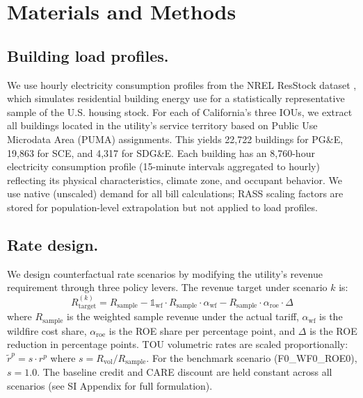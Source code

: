 \documentclass[9pt,twocolumn,twoside]{pnas-new}
\begin{document}
\section*{Materials and Methods}

\subsection*{Building load profiles.}
We use hourly electricity consumption profiles from the NREL ResStock dataset \cite{resstock2024}, which simulates residential building energy use for a statistically representative sample of the U.S. housing stock. For each of California's three IOUs, we extract all buildings located in the utility's service territory based on Public Use Microdata Area (PUMA) assignments. This yields 22,722 buildings for PG\&E, 19,863 for SCE, and 4,317 for SDG\&E. Each building has an 8,760-hour electricity consumption profile (15-minute intervals aggregated to hourly) reflecting its physical characteristics, climate zone, and occupant behavior. We use native (unscaled) demand for all bill calculations; RASS scaling factors are stored for population-level extrapolation but not applied to load profiles.

\subsection*{Rate design.}
We design counterfactual rate scenarios by modifying the utility's revenue requirement through three policy levers. The revenue target under scenario $k$ is:
\begin{equation}
    R_{\text{target}}^{(k)} = R_{\text{sample}} - \mathbb{1}_{\text{wf}} \cdot R_{\text{sample}} \cdot \alpha_{\text{wf}} - R_{\text{sample}} \cdot \alpha_{\text{roe}} \cdot \Delta
\end{equation}
where $R_{\text{sample}}$ is the weighted sample revenue under the actual tariff, $\alpha_{\text{wf}}$ is the wildfire cost share, $\alpha_{\text{roe}}$ is the ROE share per percentage point, and $\Delta$ is the ROE reduction in percentage points. TOU volumetric rates are scaled proportionally: $\tilde{r}^p = s \cdot r^p$ where $s = R_{\text{vol}} / R_{\text{sample}}$. For the benchmark scenario (F0\_WF0\_ROE0), $s = 1.0$. The baseline credit and CARE discount are held constant across all scenarios (see SI Appendix for full formulation).
\end{document}
